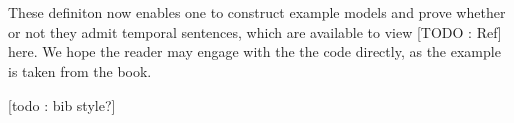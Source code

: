 \documentclass[a4paper, 11pt]{article}
\begin{document}
\begin{code}%
%
\>[2]\<%
\\
%
\>[2]\AgdaSpace{}%
\AgdaSymbol{:}\AgdaSpace{}%
\AgdaSymbol{(}\AgdaSpace{}%
\AgdaSymbol{:}\AgdaSpace{}%
\AgdaSpace{}%
\AgdaSymbol{)}\AgdaSpace{}%
\AgdaSpace{}%
\AgdaSymbol{(}\AgdaSpace{}%
\AgdaSymbol{:}\AgdaSpace{}%
\AgdaSpace{}%
\AgdaSymbol{)}\AgdaSpace{}%
\AgdaSpace{}%
\AgdaSpace{}%
\AgdaSpace{}%
\<%
\\
%
\>[2]%
\>[895I]\AgdaOperator{\AgdaFunction{,,}}\AgdaSpace{}%
\AgdaSpace{}%
\AgdaSpace{}%
\AgdaSpace{}%
\AgdaSymbol{=}\AgdaSpace{}%
\AgdaSpace{}%
\AgdaSymbol{(}\AgdaSpace{}%
\AgdaSymbol{:}\AgdaSpace{}%
\AgdaSymbol{)}\AgdaSpace{}%
\AgdaSpace{}%
\AgdaSpace{}%
\AgdaSpace{}%
\AgdaSpace{}%
\AgdaSpace{}%
\AgdaSpace{}%
\AgdaSpace{}%
\AgdaSpace{}%
\<%
\end{code}
\begin{code}[hide]%
\>[.][@{}l@{}]\<[895I]%
\>[4]\AgdaSpace{}%
\AgdaSpace{}%
\AgdaSpace{}%
\AgdaSpace{}%
\AgdaSpace{}%
\AgdaSpace{}%
\AgdaSymbol{(}\AgdaSymbol{)}\<%
\end{code}

These definiton now enables one to construct example models and prove whether or
not they admit temporal sentences, which are available to view [TODO : Ref]
here. We hope the reader may engage with the the code directly, as the example
is taken from the book.

[todo : bib style?]

\printbibliography
\end{document}
